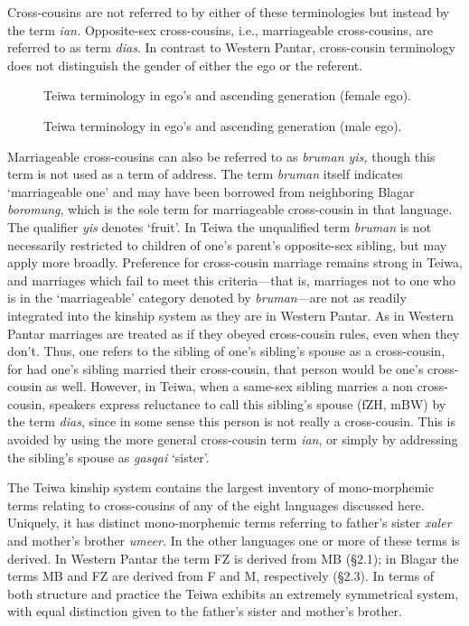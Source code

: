 Cross-cousins are not referred to by either of these terminologies but instead by the term \textit{ian.} Opposite-sex cross-cousins, i.e., marriageable cross-cousins, are referred to as term \textit{dias}. In contrast to Western Pantar, cross-cousin terminology does not distinguish the gender of either the ego or the referent.

\begin{figure}
\caption{Teiwa terminology in ego's and ascending generation (female ego). }
\end{figure}

\begin{figure}
\caption{Teiwa terminology in ego's and ascending generation (male ego). }
\end{figure}


Marriageable cross-cousins can also be referred to as \textit{bruman yis,} though this term is not used as a term of address. The term \textit{bruman} itself indicates `marriageable one' and may have been borrowed from neighboring Blagar \textit{boromung}, which is the sole term for marriageable cross-cousin in that language. The qualifier \textit{yis} denotes `fruit'. In Teiwa the unqualified term \textit{bruman} is not necessarily restricted to children of one's parent's opposite-sex sibling, but may apply more broadly. Preference for cross-cousin marriage remains strong in Teiwa, and marriages which fail to meet this criteria---that is, marriages not to one who is in the `marriageable' category denoted by \textit{bruman}{}---are not as readily integrated into the kinship system as they are in Western Pantar. As in Western Pantar marriages are treated as if they obeyed cross-cousin rules, even when they don't. Thus, one refers to the sibling of one's sibling's spouse as a cross-cousin, for had one's sibling married their cross-cousin, that person would be one's cross-cousin as well. However, in Teiwa, when a same-sex sibling marries a non cross-cousin, speakers express reluctance to call this sibling's spouse (fZH, mBW) by the term \textit{dias}, since in some sense this person is not really a cross-cousin. This is avoided by using the more general cross-cousin term \textit{ian}, or simply by addressing the sibling's spouse as \textit{gasqai} `sister'.

The Teiwa kinship system contains the largest inventory of mono-morphemic terms relating to cross-cousins of any of the eight languages discussed here. Uniquely, it has distinct mono-morphemic terms referring to father's sister \textit{xaler} and mother's brother \textit{umeer.} In the other languages one or more of these terms is derived. In Western Pantar the term FZ is derived from MB ({\S}2.1); in Blagar the terms MB and FZ are derived from F and M, respectively ({\S}2.3). In terms of both structure and practice the Teiwa exhibits an extremely symmetrical system, with equal distinction given to the father's sister and mother's brother.

